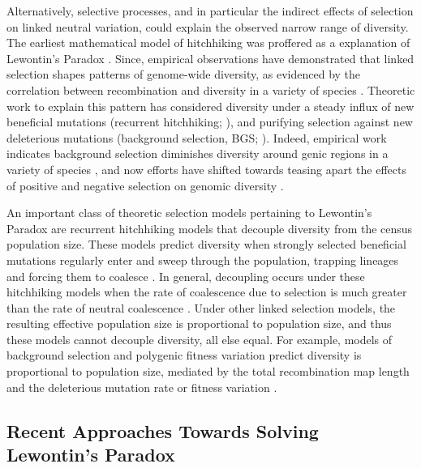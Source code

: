 \documentclass[11pt]{article}
\begin{document}
Alternatively, selective processes, and in particular the indirect effects of
selection on linked neutral variation, could explain the observed narrow range
of diversity. The earliest mathematical model of hitchhiking was proffered as a
explanation of Lewontin's Paradox \parencite{Maynard_Smith1974-zr}.  Since,
empirical observations have demonstrated that linked selection shapes patterns
of genome-wide diversity, as evidenced by the correlation between recombination
and diversity in a variety of species
\parencite{Aguade1989-jx,Begun1992-ey,Cutter2003-tl,Stephan1998-hh,Cai2009-by}.
Theoretic work to explain this pattern has considered diversity under a steady
influx of new beneficial mutations (recurrent hitchhiking;
\cite{Stephan1992-jc,Stephan1995-ry}), and purifying selection against new
deleterious mutations (background selection, BGS;
\cite{Charlesworth1993-gb,Nordborg1996-nq,Hudson1994-oh,Hudson1995-xc}).
Indeed, empirical work indicates background selection diminishes diversity
around genic regions in a variety of species
\parencite{McVicker2009-ax,Hernandez2011-gs,Charlesworth1996-px}, and now
efforts have shifted towards teasing apart the effects of positive and negative
selection on genomic diversity \parencite{Elyashiv2016-vt}.

An important class of theoretic selection models pertaining to Lewontin's
Paradox are recurrent hitchhiking models that decouple diversity from the
census population size. These models predict diversity when strongly selected
beneficial mutations regularly enter and sweep through the population, trapping
lineages and forcing them to coalesce
\parencite{Kaplan1989-sc,Gillespie2000-mh}. In general, decoupling occurs under
these hitchhiking models when the rate of coalescence due to selection is much
greater than the rate of neutral coalescence \parencite[e.g.][equation
22]{Coop2012-cd}. Under other linked selection models, the resulting effective
population size is proportional to population size, and thus these models
cannot decouple diversity, all else equal. For example, models of background
selection and polygenic fitness variation predict diversity is proportional to
population size, mediated by the total recombination map length and the
deleterious mutation rate or fitness variation
\parencite{Charlesworth1993-gb,Nicolaisen2012-vs,Nordborg1996-nq,Robertson1961-ho,Santiago1995-hx,Santiago1998-bs}.

\subsection*{Recent Approaches Towards Solving Lewontin's Paradox}
\end{document}
